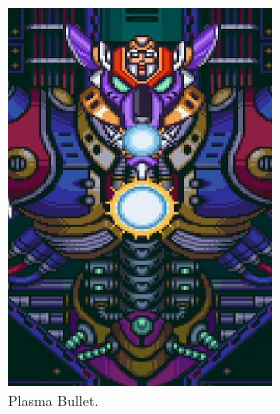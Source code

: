 \begin{figure}[htp]
\begin{figure}[htp]
\begin{subfigure}[t]{0.3\linewidth}
		\includegraphics[width=\linewidth]{figures/X1/Sigma_stages/WolfSigma_plasma.jpg}
		\caption{Plasma Bullet.}
	\end{subfigure}
	\begin{subfigure}[t]{0.3\linewidth}
		\centering

\end{subfigure}
\end{figure}
\end{figure}
